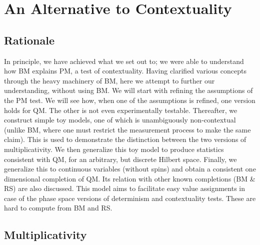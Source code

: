 %

\chapter{An Alternative to Contextuality\label{chap:An-Alternative-to-Contextuality}}


\section{Rationale}

In principle, we have achieved what we set out to; we were able to
understand how BM explains PM, a test of contextuality. Having clarified
various concepts through the heavy machinery of BM, here we attempt
to further our understanding, without using BM. We will start with
refining the assumptions of the PM test. We will see how, when one
of the assumptions is refined, one version holds for QM. The other
is not even experimentally testable. Thereafter, we construct simple
toy models, one of which is unambiguously non-contextual (unlike BM,
where one must restrict the measurement process to make the same claim).
This is used to demonstrate the distinction between the two versions
of multiplicativity. We then generalize this toy model to produce
statistics consistent with QM, for an arbitrary, but discrete Hilbert
space. Finally, we generalize this to continuous variables (without
spins) and obtain a consistent one dimensional completion of QM. Its
relation with other known completions (BM \& RS) are also discussed.
This model aims to facilitate easy value assignments in case of the
phase space versions of determinism and contextuality tests. These
are hard to compute from BM and RS.


\section{Multiplicativity \label{sec:Multiplicativity}}

